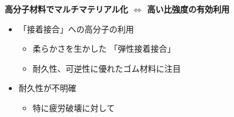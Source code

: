 
\begin{columns}[totalwidth=.9\linewidth]
    \column{\textwidth}
        \begin{boxnote}
            \textbf{高分子材料でマルチマテリアル化 $\Leftrightarrow$ 高い比強度の有効利用}
            \begin{itemize}
                \item {\color{red} 「接着接合」}への高分子の利用
                    \begin{itemize}
                        \item 柔らかさを生かした{\color{red} 「弾性接着接合」}
                        \item 耐久性、可逆性に優れた\alert{ゴム材料に注目}
                    \end{itemize}
                \item {\color{blue}耐久性が不明確}
                    \begin{itemize}
                        \item 特に疲労破壊に対して
                    \end{itemize}
            \end{itemize}
        \end{boxnote}
\end{columns}

